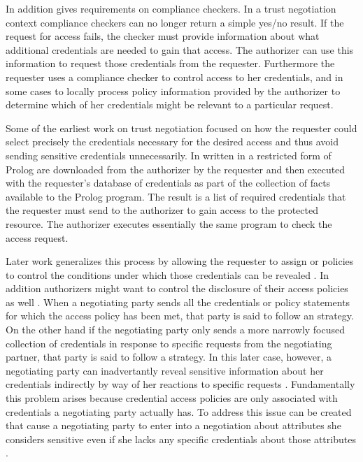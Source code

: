 In addition \cite{seamons-policy02} gives requirements on compliance checkers.
In a trust negotiation context compliance checkers can no longer return a
simple yes/no result. If the request for access fails, the checker must
provide information about what additional credentials are needed to gain that
access. The authorizer can use this information to request those credentials
from the requester. Furthermore the requester uses a compliance checker to
control access to her credentials, and in some cases to locally process
policy information provided by the authorizer to determine which of her
credentials might be relevant to a particular request.

Some of the earliest work on trust negotiation focused on how the requester
could select precisely the credentials necessary for the desired access and
thus avoid sending sensitive credentials unnecessarily. In
\cite{seamons97internet}  written in a
restricted form of Prolog are downloaded from the authorizer by the requester
and then executed with the requester's database of credentials as part of the
collection of facts available to the Prolog program. The result is a list of
required credentials that the requester must send to the authorizer to gain
access to the protected resource. The authorizer executes essentially the same
program to check the access request.

Later work generalizes this process by allowing the requester to assign
 or  policies to
control the conditions under which those credentials can be revealed
\cite{Winsborough:ATN,Yu:PECSATNI}. In addition authorizers might want to
control the disclosure of their access policies as well
\cite{Seamons:LDACPATN}. When a negotiating party sends all the credentials or
policy statements for which the access policy has been met, that party is said
to follow an  strategy. On the other hand if the negotiating
party only sends a more narrowly focused collection of credentials in response
to specific requests from the negotiating partner, that party is said to
follow a  strategy. In this later case, however, a
negotiating party can inadvertantly reveal sensitive information about her
credentials indirectly by way of her reactions to specific requests
\cite{Winsborough:ATN,Winsborough:TPATN,Winsborough:SATN}. Fundamentally this
problem arises because credential access policies are only associated with
credentials a negotiating party actually has. To address this issue
 can be created that cause a negotiating party to enter
into a negotiation about attributes she considers sensitive even if she lacks
any specific credentials about those attributes
\cite{Winsborough:TPATN,Winsborough:SATN}.

